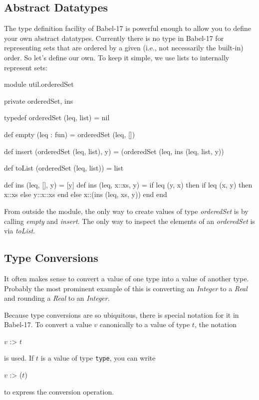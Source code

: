 \documentclass[11pt]{amsart}
\begin{document}
\subsection{Abstract Datatypes}
The type definition facility of Babel-17 is powerful enough to allow you to define your own abstract datatypes. Currently there is no type in Babel-17 for representing sets that are ordered by a given (i.e., not necessarily the built-in) order. So let's define our own. To keep it simple, we use lists to internally represent sets:
\begin{babellisting}
module util.orderedSet

  private orderedSet, ins
  
  typedef orderedSet (leq, list) = nil
  
  def empty (leq : fun) = orderedSet (leq, [])
  
  def insert (orderedSet (leq, list), y) = (orderedSet (leq, ins (leq, list, y))
  
  def toList (orderedSet (leq, list)) = list
  
  def ins (leq, [], y) = [y]
  def ins (leq, x::xs, y) =
    if leq (y, x) then
        if leq (x, y) then x::xs else y::x::xs end
    else
        x::(ins (leq, xs, y))
    end  
end
\end{babellisting}
From outside the module, the only way to create values of type \emph{orderedSet}  is by calling \emph{empty} and \emph{insert}. The only way to inspect the elements of an \emph{orderedSet} is via \emph{toList}.

\subsection{Type Conversions}
It often makes sense to convert a value of one type into a value of another type. Probably the most prominent example of this is converting an \emph{Integer} to a \emph{Real} and rounding a \emph{Real} to an \emph{Integer}.

Because type conversions are so ubiquitous, there is special notation for it in Babel-17. To convert a value $v$ canonically to a value of type $t$, the notation
\begin{babellisting}
$v$ :> $t$
\end{babellisting}
is used. If $t$ is a value of type \texttt{type}, you can write
\begin{babellisting}
$v$ :> ($t$)
\end{babellisting}
to express the conversion operation.
\end{document}
